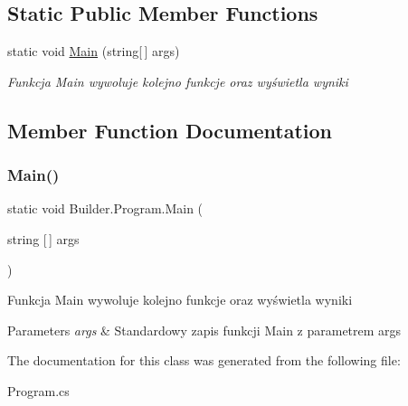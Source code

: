 \subsection*{Static Public Member Functions}
\begin{DoxyCompactItemize}
\item 
static void \hyperlink{class_builder_1_1_program_a414b7e29e16f01d915ac02dffa280ebc}{Main} (string\mbox{[}$\,$\mbox{]} args)
\begin{DoxyCompactList}\small\item\em Funkcja Main wywoluje kolejno funkcje oraz wyświetla wyniki \end{DoxyCompactList}\end{DoxyCompactItemize}


\subsection{Member Function Documentation}
\mbox{\label{class_builder_1_1_program_a414b7e29e16f01d915ac02dffa280ebc}} 
\subsubsection{\texorpdfstring{Main()}{Main()}}
{\footnotesize\ttfamily static void Builder.\+Program.\+Main (\begin{DoxyParamCaption}\item[{string \mbox{[}$\,$\mbox{]}}]{args }\end{DoxyParamCaption})\hspace{0.3cm}{\ttfamily [static]}}



Funkcja Main wywoluje kolejno funkcje oraz wyświetla wyniki 


\begin{DoxyParams}{Parameters}
{\em args} & Standardowy zapis funkcji Main z parametrem args\\
\hline
\end{DoxyParams}


The documentation for this class was generated from the following file\+:\begin{DoxyCompactItemize}
\item 
Program.\+cs\end{DoxyCompactItemize}
